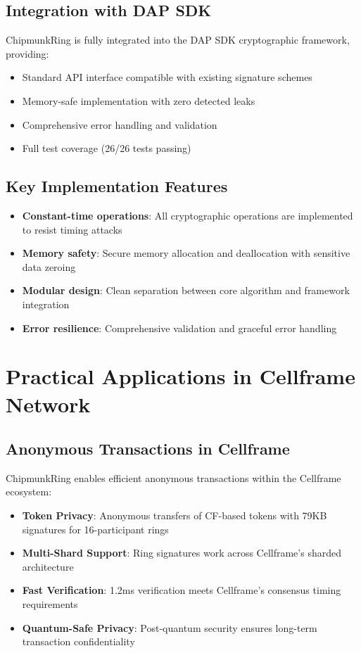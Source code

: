\documentclass[11pt,a4paper]{article}
\begin{document}
\subsection{Integration with DAP SDK}

ChipmunkRing is fully integrated into the DAP SDK cryptographic framework, providing:

\begin{itemize}
\item Standard API interface compatible with existing signature schemes
\item Memory-safe implementation with zero detected leaks
\item Comprehensive error handling and validation
\item Full test coverage (26/26 tests passing)
\end{itemize}

\subsection{Key Implementation Features}

\begin{itemize}
\item \textbf{Constant-time operations}: All cryptographic operations are implemented to resist timing attacks
\item \textbf{Memory safety}: Secure memory allocation and deallocation with sensitive data zeroing
\item \textbf{Modular design}: Clean separation between core algorithm and framework integration
\item \textbf{Error resilience}: Comprehensive validation and graceful error handling
\end{itemize}

\section{Practical Applications in Cellframe Network}

\subsection{Anonymous Transactions in Cellframe}

ChipmunkRing enables efficient anonymous transactions within the Cellframe ecosystem:
\begin{itemize}
\item \textbf{Token Privacy}: Anonymous transfers of CF-based tokens with 79KB signatures for 16-participant rings
\item \textbf{Multi-Shard Support}: Ring signatures work across Cellframe's sharded architecture
\item \textbf{Fast Verification}: 1.2ms verification meets Cellframe's consensus timing requirements
\item \textbf{Quantum-Safe Privacy}: Post-quantum security ensures long-term transaction confidentiality
\end{itemize}
\end{document}
